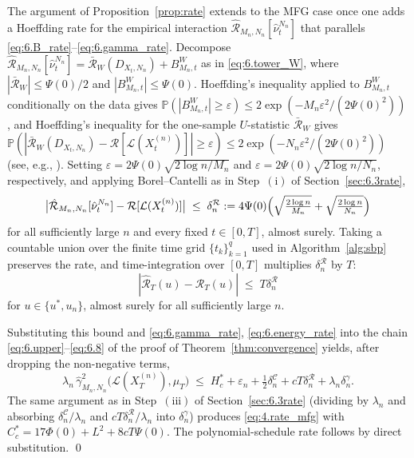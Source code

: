 \documentclass[11pt,leqno]{article}
\theoremstyle{plain}
\theoremstyle{remark}
\theoremstyle{definition}
\numberwithin{equation}{section}
\numberwithin{figure}{section}
\numberwithin{table}{section}
\numberwithin{algorithm}{section}
\begin{document}
The argument of Proposition~\ref{prop:rate} extends to the MFG case
once one adds a Hoeffding rate for the empirical interaction $\hat{\mathcal{R}}_{M_n,N_n}[\hat\nu^{N_n}_{t}]$
that parallels \eqref{eq:6.B_rate}--\eqref{eq:6.gamma_rate}.
Decompose $\hat{\mathcal{R}}_{M_n,N_n}[\hat\nu^{N_n}_{t}] = \bar{\mathcal{R}}_W(D_{X_t,N_n})+B^W_{M_n,t}$
as in \eqref{eq:6.tower_W}, where $|\bar{\mathcal{R}}_W|\le \Psi(0)/2$ and $|B^W_{M_n,t}|\le \Psi(0)$.
Hoeffding's inequality applied to $B^W_{M_n,t}$ conditionally on the data gives
$\mathbb{P}(|B^W_{M_n,t}|\ge\varepsilon)\le 2\exp(-M_n\varepsilon^2/(2\Psi(0)^2))$,
and Hoeffding's inequality for the one-sample $U$-statistic $\bar{\mathcal{R}}_W$
gives $\mathbb{P}(|\bar{\mathcal{R}}_W(D_{X_t,N_n})-\mathcal{R}[\mathcal{L}(X_t^{(n)})]|\ge\varepsilon)\le 2\exp(-N_n\varepsilon^2/(2\Psi(0)^2))$ (see, e.g., \cite[Section~5.6]{ser:1980}).
Setting $\varepsilon=2\Psi(0)\sqrt{2\log n/M_n}$ and $\varepsilon=2\Psi(0)\sqrt{2\log n/N_n}$, respectively,
and applying Borel--Cantelli as in Step~$(\mathrm{i})$ of Section~\ref{sec:6.3rate},
\begin{equation}\label{eq:6.R_rate_mfg}
 \bigl|\hat{\mathcal{R}}_{M_n,N_n}[\hat\nu^{N_n}_t]-\mathcal{R}[\mathcal{L}(X_t^{(n)})]\bigr|
 \;\le\;\delta^{\mathcal{R}}_n:=4\Psi(0)\Bigl(\sqrt{\tfrac{2\log n}{M_n}}+\sqrt{\tfrac{2\log n}{N_n}}\Bigr)
\end{equation}
for all sufficiently large $n$ and every fixed $t\in[0,T]$, almost surely.
Taking a countable union over the finite time grid $\{t_k\}_{k=1}^{q}$ used in Algorithm~\ref{alg:sbp}
preserves the rate, and time-integration over $[0,T]$ multiplies $\delta^{\mathcal{R}}_n$ by $T$:
\[
 |\hat{\mathcal{R}}_T(u)-\mathcal{R}_T(u)|\;\le\;T\delta^{\mathcal{R}}_n
\]
for $u\in\{u^*,u_n\}$, almost surely for all sufficiently large $n$.

Substituting this bound and \eqref{eq:6.gamma_rate}, \eqref{eq:6.energy_rate} into the chain \eqref{eq:6.upper}--\eqref{eq:6.8} of the proof of Theorem~\ref{thm:convergence}
yields, after dropping the non-negative terms,
\[
 \lambda_n\,\hat{\gamma}_{M_n,N_n}^2\bigl(\mathcal{L}(X_T^{(n)}),\mu_T\bigr)
 \;\le\; H^*_c + \varepsilon_n + \tfrac{1}{2}\delta^{\mathcal{C}}_n + cT\delta^{\mathcal{R}}_n + \lambda_n\delta^\gamma_n.
\]
The same argument as in Step~$(\mathrm{iii})$ of Section~\ref{sec:6.3rate}
(dividing by $\lambda_n$ and absorbing $\delta^{\mathcal{C}}_n/\lambda_n$ and $cT\delta^{\mathcal{R}}_n/\lambda_n$ into $\delta^\gamma_n$)
produces \eqref{eq:4.rate_mfg} with $C^*_c=17\Phi(0)+L^2+8cT\Psi(0)$.
The polynomial-schedule rate follows by direct substitution.
\qed
\end{document}
